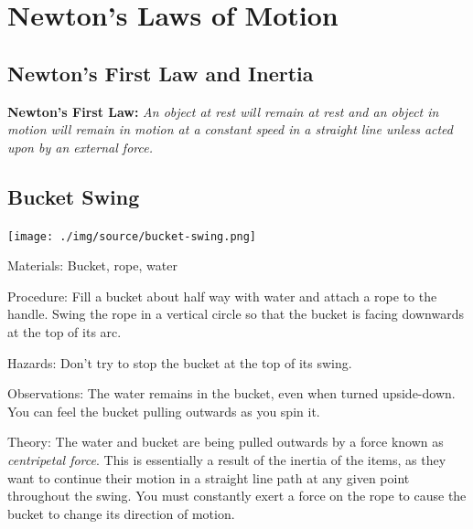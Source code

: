 \section{Newton's Laws of Motion}

\begin{multicols}{2}


\section*{Newton's First Law and Inertia}
\textbf{Newton's First Law: }\emph{An object at rest will remain at rest and an object in motion will remain in motion at a constant speed in a straight line unless acted upon by an external force.}

\subsection{Bucket Swing}

\begin{center}
\texttt{[image: ./img/source/bucket-swing.png]}
\end{center}

\begin{description*}
\item[Materials:]{Bucket, rope, water}
\item[Procedure:]{Fill a bucket about half way with water and attach a rope to the handle. Swing the rope in a vertical circle so that the bucket is facing downwards at the top of its arc.}
\item[Hazards:]{Don't try to stop the bucket at the top of its swing.}
\item[Observations:]{The water remains in the bucket, even when turned upside-down. You can feel the bucket pulling outwards as you spin it.}
\item[Theory:]{The water and bucket are being pulled outwards by a force known as \emph{centripetal force}. This is essentially a result of the inertia of the items, as they want to continue their motion in a straight line path at any given point throughout the swing. You must constantly exert a force on the rope to cause the bucket to change its direction of motion.}
\end{description*}


\end{multicols}
